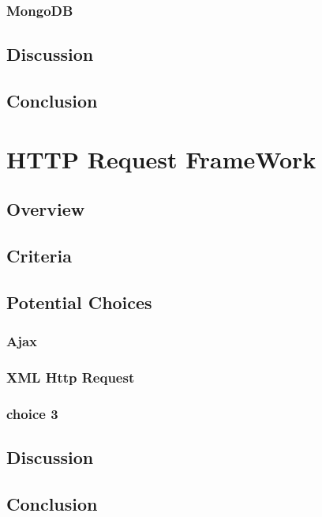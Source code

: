 \documentclass[letterpaper,10pt]{article}
\begin{document}
		\subsubsection{MongoDB}
		
	\subsection{Discussion}
	
	\subsection{Conclusion}
	
	
\section{HTTP Request FrameWork}
		\subsection{Overview}
	
	\subsection{Criteria}
	
	\subsection{Potential Choices}
		\subsubsection{Ajax}
		
		\subsubsection{XML Http Request}
		
		\subsubsection{choice 3}
		
	\subsection{Discussion}
	
	\subsection{Conclusion}
	
\end{document}
